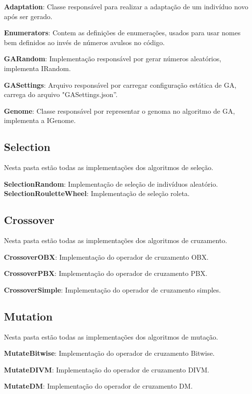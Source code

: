  \textbf{Adaptation}: Classe responsável para realizar a adaptação de um indivíduo novo após ser gerado.
 
 \textbf{Enumerators}: Contem as definições de enumerações, usados para usar nomes bem definidos ao invés de números avulsos no código.
 
 \textbf{GARandom}: Implementação responsável por gerar números aleatórios, implementa IRandom.
 
 \textbf{GASettings}: Arquivo responsável por carregar configuração estática de GA, carrega do arquivo "GASettings.json”.
 
 \textbf{Genome}: Classe responsável por representar o genoma no algoritmo de GA, implementa a IGenome.
 
 
 \subsection{Selection}
 
 Nesta pasta estão todas as implementações dos algoritmos de seleção.
 
 \textbf{SelectionRandom}: Implementação de seleção de indivíduos aleatório.
 \textbf{SelectionRouletteWheel}: Implementação de seleção roleta.
 
 \subsection{Crossover}
 
 Nesta pasta estão todas as implementações dos algoritmos de cruzamento.
 
 \textbf{CrossoverOBX}: Implementação do operador de cruzamento OBX.
 
 \textbf{CrossoverPBX}: Implementação do operador de cruzamento PBX.
 
 \textbf{CrossoverSimple}:  Implementação do operador de cruzamento simples.
 
 \subsection{Mutation}
 
 Nesta pasta estão todas as implementações dos algoritmos de mutação.
 
 \textbf{MutateBitwise}: Implementação do operador de cruzamento Bitwise.
 
 \textbf{MutateDIVM}: Implementação do operador de cruzamento DIVM.
 
 \textbf{MutateDM}: Implementação do operador de cruzamento DM.
 
